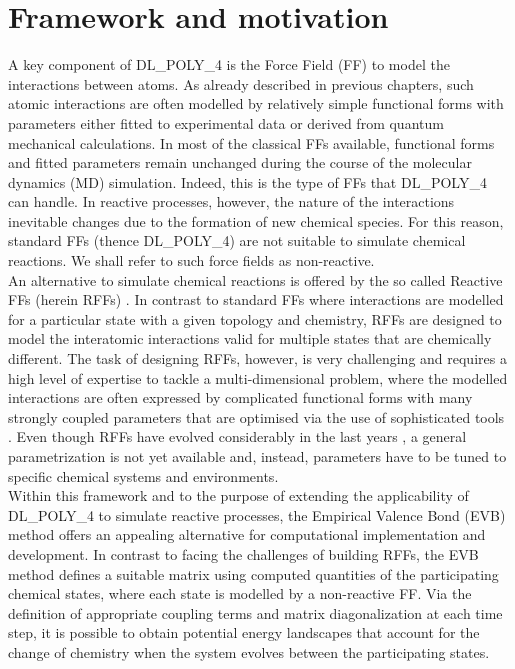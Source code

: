 \section{Framework and motivation}
A key component of DL\_POLY\_4 is the Force Field (FF) to model the interactions between atoms. As already described in previous chapters, such atomic interactions are often modelled by relatively simple functional forms with parameters either fitted to experimental data or derived from quantum mechanical calculations. In most of the classical FFs available, functional forms and fitted parameters remain unchanged during the course of the molecular dynamics (MD) simulation. Indeed, this is the type of FFs that DL\_POLY\_4 can handle. In reactive processes, however, the nature of the interactions inevitable changes due to the formation of new chemical species. For this reason, standard FFs (thence DL\_POLY\_4) are not suitable to simulate chemical reactions. We shall refer to such force fields as non-reactive.\\
An alternative to simulate chemical reactions is offered by the so called Reactive FFs (herein RFFs) \cite{vanduin2001,farah2012,senftle2016,yun2017,islam2016,liang2013}. In contrast to standard FFs where interactions are modelled for a particular state with a given topology and chemistry, RFFs are designed to model the interatomic interactions valid for multiple states that are chemically different. The task of designing RFFs, however, is very challenging and requires a high level of expertise \cite{liang2013} to tackle a multi-dimensional problem, where the modelled interactions are often expressed by complicated functional forms with many strongly coupled parameters that are optimised via the use of sophisticated tools \cite{pahari2012,larsson2013,li2013,jaramillo2014,larentzos2015,rice2015,dittner2015}. Even though RFFs have evolved considerably in the last years \cite{farah2012,shin2012}, a general parametrization is not yet available and, instead, parameters have to be tuned to specific chemical systems and environments.\\
Within this framework and to the purpose of extending the applicability of DL\_POLY\_4 to simulate reactive processes, the Empirical Valence Bond (EVB) method \cite{warshel1980,hartke2015,duarte2017} offers an appealing alternative for computational implementation and development. In contrast to facing the challenges of building RFFs, the EVB method defines a suitable matrix using computed quantities of the participating chemical states, where each state is modelled by a non-reactive FF. Via the definition of appropriate coupling terms and matrix diagonalization at each time step, it is possible to obtain potential energy landscapes that account for the change of chemistry when the system evolves between the participating states.\\
